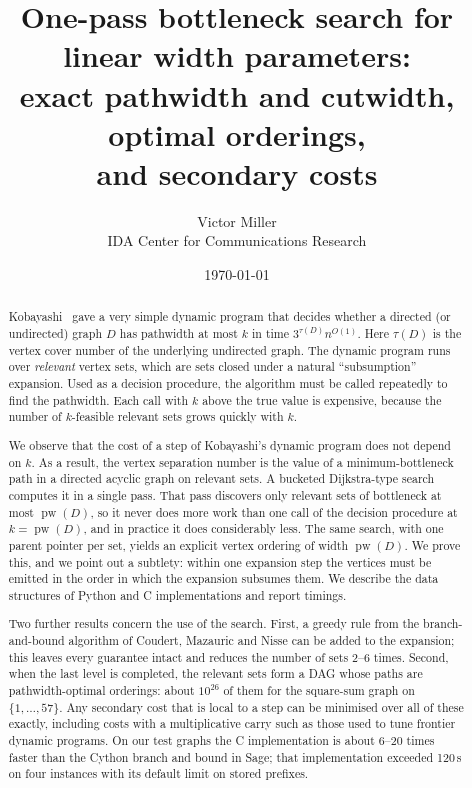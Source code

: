 \documentclass[11pt]{article}
\title{One-pass bottleneck search for linear width parameters:\\
exact pathwidth and cutwidth, optimal orderings,\\
and secondary costs}
\author{Victor Miller\\ {\small IDA Center for Communications Research}}
\date{\today}
\theoremstyle{definition}
\newcommand{\pw}{\operatorname{pw}}
\begin{document}
\maketitle

\begin{abstract}
Kobayashi~\cite{Kob15} gave a very simple dynamic program that decides
whether a directed (or undirected) graph $D$ has pathwidth at most $k$ in
time $3^{\tau(D)} n^{O(1)}$. Here $\tau(D)$ is the vertex cover number of the
underlying undirected graph. The dynamic program runs over \emph{relevant}
vertex sets, which are sets closed under a natural ``subsumption''
expansion. Used as a decision procedure, the algorithm must be called
repeatedly to find the pathwidth. Each call with $k$ above the true value is
expensive, because the number of $k$-feasible relevant sets grows quickly
with $k$.

We observe that the cost of a step of Kobayashi's dynamic program does not
depend on $k$. As a result, the vertex separation number is the value of a
minimum-bottleneck path in a directed acyclic graph on relevant sets. A
bucketed Dijkstra-type search computes it in a single pass. That pass
discovers only relevant sets of bottleneck at most $\pw(D)$, so it never
does more work than one call of the decision procedure at $k=\pw(D)$, and in
practice it does considerably less. The same search, with one parent pointer
per set, yields an explicit vertex ordering of width $\pw(D)$. We prove this,
and we point out a subtlety: within one expansion step the vertices must be
emitted in the order in which the expansion subsumes them. We describe the
data structures of Python and C implementations and report timings.

Two further results concern the use of the search. First, a greedy rule from
the branch-and-bound algorithm of Coudert, Mazauric and Nisse can be added to
the expansion; this leaves every guarantee intact and reduces the number of
sets 2--6 times. Second, when the last level is completed, the relevant sets
form a DAG whose paths are pathwidth-optimal orderings: about $10^{26}$ of
them for the square-sum graph on $\{1,\dots,57\}$. Any secondary cost that
is local to a step can be minimised over all of these exactly, including
costs with a multiplicative carry such as those used to tune frontier
dynamic programs. On our test graphs the C implementation is about 6--20
times faster than the Cython branch and bound in Sage; that implementation
exceeded 120\,s on four instances with its default limit on stored prefixes.


\end{abstract}
\end{document}

